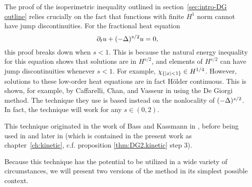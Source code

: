 %
%
%
%


%

The proof of the isoperimetric inequality outlined in section~\ref{sec:intro-DG outline} relies crucially on the fact that functions with finite $H^1$ norm cannot have jump discontinuities.  For the fractional heat equation
\begin{equation} \label{eq:CCV-main}
\partial_t u + (-\Delta)^{s/2} u = 0,
\end{equation}
this proof breaks down when $s < 1$.  This is because the natural energy inequality for this equation shows that solutions are in $H^{s/2}$, and elements of $H^{s/2}$ can have jump discontinuities whenever $s < 1$.  For example, $\chi_{\{|x|<1\}} \in H^{1/4}$.  However, solutions to these low-order heat equations are in fact H\"{o}lder continuous.  This is shown, for example, by Caffarelli, Chan, and Vasseur in \cite{CaChVa.nio} using the De Giorgi method.  The technique they use is based instead on the nonlocality of $(-\Delta)^{s/2}$.  In fact, the technique will work for any $s \in (0,2)$.  

This technique originated in the work of Bass and Kassmann in \cite{BaKa}, before being used in \cite{CaChVa.nio} and later in \cite{St.hypo} (which is contained in the present work as chapter~\ref{ch:kinetic}, c.f. proposition \eqref{thm:DG2.kinetic} step 3).  

Because this technique has the potential to be utilized in a wide variety of circumstances, we will present two versions of the method in its simplest possible context.  

